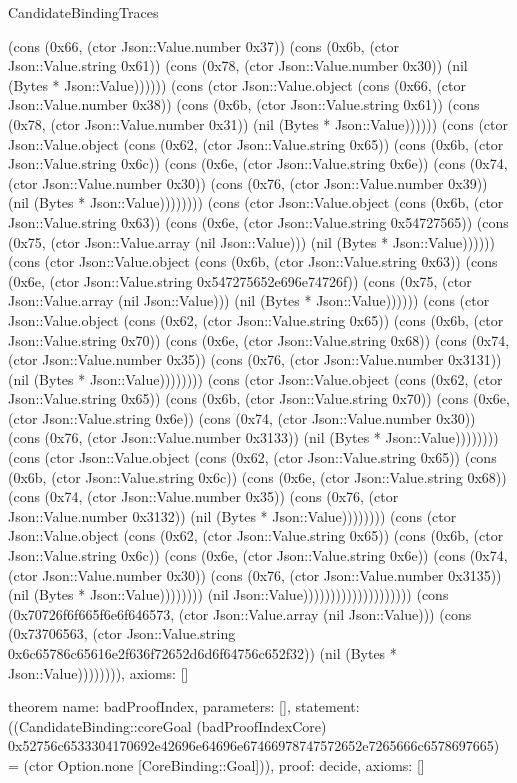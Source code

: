 \begin{lexlean}{CandidateBindingTraces}
\begin{semanticmodule}
{(cons (0x66, (ctor Json::Value.number 0x37)) (cons (0x6b, (ctor Json::Value.string 0x61)) (cons (0x78, (ctor Json::Value.number 0x30)) (nil (Bytes * Json::Value)))))) (cons (ctor Json::Value.object (cons (0x66, (ctor Json::Value.number 0x38)) (cons (0x6b, (ctor Json::Value.string 0x61)) (cons (0x78, (ctor Json::Value.number 0x31)) (nil (Bytes * Json::Value)))))) (cons (ctor Json::Value.object (cons (0x62, (ctor Json::Value.string 0x65)) (cons (0x6b, (ctor Json::Value.string 0x6c)) (cons (0x6e, (ctor Json::Value.string 0x6e)) (cons (0x74, (ctor Json::Value.number 0x30)) (cons (0x76, (ctor Json::Value.number 0x39)) (nil (Bytes * Json::Value)))))))) (cons (ctor Json::Value.object (cons (0x6b, (ctor Json::Value.string 0x63)) (cons (0x6e, (ctor Json::Value.string 0x54727565)) (cons (0x75, (ctor Json::Value.array (nil Json::Value))) (nil (Bytes * Json::Value)))))) (cons (ctor Json::Value.object (cons (0x6b, (ctor Json::Value.string 0x63)) (cons (0x6e, (ctor Json::Value.string 0x547275652e696e74726f)) (cons (0x75, (ctor Json::Value.array (nil Json::Value))) (nil (Bytes * Json::Value)))))) (cons (ctor Json::Value.object (cons (0x62, (ctor Json::Value.string 0x65)) (cons (0x6b, (ctor Json::Value.string 0x70)) (cons (0x6e, (ctor Json::Value.string 0x68)) (cons (0x74, (ctor Json::Value.number 0x35)) (cons (0x76, (ctor Json::Value.number 0x3131)) (nil (Bytes * Json::Value)))))))) (cons (ctor Json::Value.object (cons (0x62, (ctor Json::Value.string 0x65)) (cons (0x6b, (ctor Json::Value.string 0x70)) (cons (0x6e, (ctor Json::Value.string 0x6e)) (cons (0x74, (ctor Json::Value.number 0x30)) (cons (0x76, (ctor Json::Value.number 0x3133)) (nil (Bytes * Json::Value)))))))) (cons (ctor Json::Value.object (cons (0x62, (ctor Json::Value.string 0x65)) (cons (0x6b, (ctor Json::Value.string 0x6c)) (cons (0x6e, (ctor Json::Value.string 0x68)) (cons (0x74, (ctor Json::Value.number 0x35)) (cons (0x76, (ctor Json::Value.number 0x3132)) (nil (Bytes * Json::Value)))))))) (cons (ctor Json::Value.object (cons (0x62, (ctor Json::Value.string 0x65)) (cons (0x6b, (ctor Json::Value.string 0x6c)) (cons (0x6e, (ctor Json::Value.string 0x6e)) (cons (0x74, (ctor Json::Value.number 0x30)) (cons (0x76, (ctor Json::Value.number 0x3135)) (nil (Bytes * Json::Value)))))))) (nil Json::Value)))))))))))))))))))) (cons (0x70726f6f665f6e6f646573, (ctor Json::Value.array (nil Json::Value))) (cons (0x73706563, (ctor Json::Value.string 0x6c65786c65616e2f636f72652d6d6f64756c652f32)) (nil (Bytes * Json::Value)))))))),
 axioms: []
}

theorem{
 name: badProofIndex,
 parameters: [],
 statement: ((CandidateBinding::coreGoal (badProofIndexCore) 0x52756c6533304170692e42696e64696e67466978747572652e7265666c6578697665) = (ctor Option.none [CoreBinding::Goal])),
 proof: decide{},
 axioms: []
}


\end{semanticmodule}
\end{lexlean}
